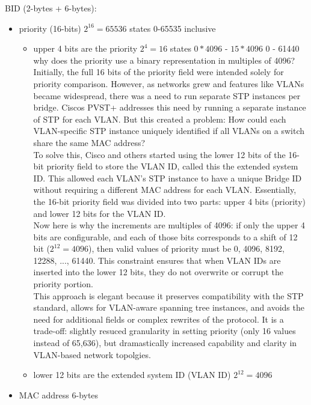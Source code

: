 \documentclass[parindent=0pt]{article}
\begin{document}
BID (2-bytes + 6-bytes):
	\begin{itemize}
		\item priority (16-bits) $2^16 = 65536$ states 0-65535 inclusive
			\begin{itemize}
				\item upper 4 bits are the priority $2^4 = 16$ states $0*4096$ - $15*4096$ 0 - 61440
					why does the priority use a binary representation in multiples of 4096?\\
						
					Initially, the full 16 bits of the priority field were intended solely for priority comparison. However, as networks grew and features like VLANs became widespread, there was a need to run separate STP instances per bridge. Ciscos PVST+ addresses this need by running a separate instance of STP for each VLAN. But this created a problem: How could each VLAN-specific STP instance uniquely identified if all VLANs on a switch share the same MAC address?\\

					To solve this, Cisco and others started using the lower 12 bits of the 16-bit priority field to store the VLAN ID, called this the extended system ID. This allowed each VLAN's STP instance to have a unique Bridge ID without requiring a different MAC address for each VLAN. Essentially, the 16-bit priority field was divided into two parts: upper 4 bits (priority) and lower 12 bits for the VLAN ID.\\

					Now here is why the increments are multiples of 4096: if only the upper 4 bits are configurable, and each of those bits corresponds to a shift of 12 bit ($2^12 = 4096$), then valid values of priority must be 0, 4096, 8192, 12288, ..., 61440. This constraint ensures that when VLAN IDs are inserted into the lower 12 bits, they do not overwrite or corrupt the priority portion.\\

					This approach is elegant because it preserves compatibility with the STP standard, allows for VLAN-aware spanning tree instances, and avoids the need for additional fields or complex rewrites of the protocol. It is a trade-off: slightly resuced granularity in setting priority (only 16 values instead of 65,636), but dramastically increased capability and clarity in VLAN-based network topolgies.

				\item lower 12 bits are the extended system ID (VLAN ID) $2^12 = 4096$
			\end{itemize}
		\item MAC address 6-bytes
	\end{itemize}
\end{document}

